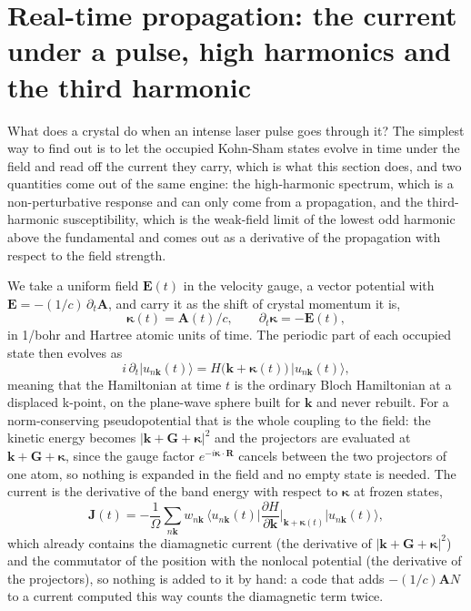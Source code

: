 \documentclass[11pt,a4paper]{article}
\begin{document}
\section{Real-time propagation: the current under a pulse, high harmonics and the third harmonic}

What does a crystal do when an intense laser pulse goes through it? The
simplest way to find out is to let the occupied Kohn-Sham states evolve in time
under the field and read off the current they carry, which is what this section
does, and two quantities come out of the same engine: the high-harmonic
spectrum, which is a non-perturbative response and can only come from a
propagation, and the third-harmonic susceptibility, which is the weak-field
limit of the lowest odd harmonic above the fundamental and comes out as a
derivative of the propagation with respect to the field strength.

We take a uniform field $\mathbf E(t)$ in the velocity gauge, a vector potential
with $\mathbf E = -(1/c)\,\partial_t\mathbf A$, and carry it as the shift of
crystal momentum it is,
\begin{equation*}
\boldsymbol\kappa(t) = \mathbf A(t)/c, \qquad
\partial_t\boldsymbol\kappa = -\mathbf E(t),
\end{equation*}
in 1/bohr and Hartree atomic units of time. The periodic part of each occupied
state then evolves as
\begin{equation*}
i\,\partial_t|u_{n\mathbf k}(t)\rangle
 = H\big(\mathbf k+\boldsymbol\kappa(t)\big)\,|u_{n\mathbf k}(t)\rangle ,
\end{equation*}
meaning that the Hamiltonian at time $t$ is the ordinary Bloch Hamiltonian at a
displaced k-point, on the plane-wave sphere built for $\mathbf k$ and never
rebuilt. For a norm-conserving pseudopotential that is the whole coupling to
the field: the kinetic energy becomes $|\mathbf k+\mathbf G+\boldsymbol\kappa|^2$
and the projectors are evaluated at $\mathbf k+\mathbf G+\boldsymbol\kappa$, since
the gauge factor $e^{-i\boldsymbol\kappa\cdot\mathbf R}$ cancels between the two
projectors of one atom, so nothing is expanded in the field and no empty state
is needed. The current is the derivative of the band energy with respect to
$\boldsymbol\kappa$ at frozen states,
\begin{equation*}
\mathbf J(t) = -\frac{1}{\Omega}\sum_{n\mathbf k} w_{n\mathbf k}\,
  \Big\langle u_{n\mathbf k}(t)\Big|\frac{\partial H}{\partial\mathbf k}
  \Big|_{\mathbf k+\boldsymbol\kappa(t)}\Big|u_{n\mathbf k}(t)\Big\rangle ,
\end{equation*}
which already contains the diamagnetic current (the derivative of
$|\mathbf k+\mathbf G+\boldsymbol\kappa|^2$) and the commutator of the position
with the nonlocal potential (the derivative of the projectors), so nothing is
added to it by hand: a code that adds $-(1/c)\mathbf A N$ to a current computed
this way counts the diamagnetic term twice.
\end{document}
